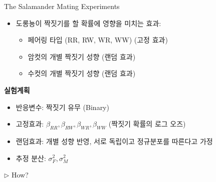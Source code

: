 \documentclass[9pt, xelatex]{beamer}
\begin{document}
{\begin{frame}[allowframebreaks]{The Salamander Mating Experiments}
\begin{itemize}
			\item 도롱뇽이 짝짓기를 할 확률에 영향을 미치는 효과:
			\begin{itemize}
				\item 페어링 타입 (RR, RW, WR, WW) (고정 효과)
				\item 암컷의 개별 짝짓기 성향 (랜덤 효과)
				\item 수컷의 개별 짝짓기 성향 (랜덤 효과)
			\end{itemize}
		\end{itemize}
		
		\framebreak
		\textbf{실험계획} \\
		\vspace{4mm}
		\begin{itemize}
			
			\item 반응변수: 짝짓기 유무 (Binary)
			\item 고정효과: $\beta_{RR}, \beta_{RW}, \beta_{WR}, \beta_{WW}$ (짝짓기 확률의 로그 오즈)
			\item 랜덤효과: 개별 성향 반영, 서로 독립이고 정규분포를 따른다고 가정
			\item 추정 분산: $\sigma_{F}^{2}, \sigma_{M}^{2}$
			
		\end{itemize}
		\vspace{5mm}
		
		$\triangleright$ How?
		
		
	\end{frame}
}
\end{document}
